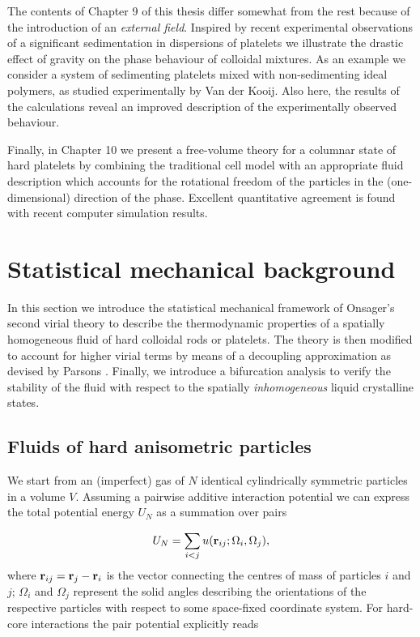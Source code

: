 {The contents of  Chapter 9 of this thesis differ somewhat from the  rest because of the introduction of an  {\em external field}.
Inspired by recent experimental observations of a significant sedimentation in dispersions of platelets
 we illustrate the drastic effect of gravity
 on the phase behaviour of colloidal mixtures. As an example we consider a system
of sedimenting platelets mixed with non-sedimenting ideal polymers, as studied
experimentally by Van der Kooij. Also here,  the results of the calculations
reveal an improved description of the experimentally observed
behaviour.

Finally, in Chapter  10  we present a free-volume theory for a columnar state of hard platelets  by combining the traditional cell model with an appropriate fluid description which accounts for the rotational freedom of the particles in the (one-dimensional) direction of the phase. Excellent quantitative agreement is found with recent computer simulation results.



\section{Statistical mechanical background}
\noindent In this section we introduce the statistical mechanical framework of  Onsager's second virial theory \cite{onsager1949,Vroege92,Cotter} to describe the thermodynamic properties of a spatially homogeneous fluid of hard colloidal rods or platelets. The theory is then modified to account for higher virial terms by means of a decoupling approximation as devised by Parsons \cite{Parsons}. Finally, we introduce a bifurcation analysis to verify  the stability of the  fluid with respect to the spatially {\em inhomogeneous} liquid crystalline states.

\subsection{Fluids of hard anisometric particles}

We start from an (imperfect) gas of $N$ identical cylindrically symmetric particles in a volume $V$. Assuming a pairwise additive interaction potential we can express the total potential energy $U_{N}$  as a summation over pairs

\begin{equation}
U_{N}=\sum_{i<j} u({\bf r}_{ij}; \Omega_{i}, \Omega_{j}),
\end{equation}
where ${\bf r}_{ij}={\bf r} _{j}- {\bf r} _{i}$ is the vector connecting the centres of mass of particles $i$ and $j$; $\Omega_{i}$ and $\Omega_{j}$ represent the solid angles describing the orientations of the respective particles with respect to some space-fixed coordinate system. For hard-core interactions the pair potential explicitly reads

}
